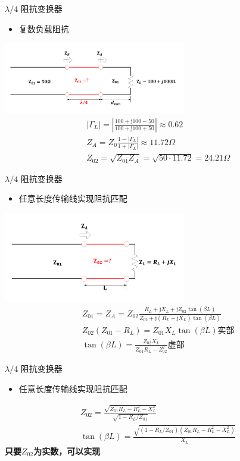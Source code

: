 \begin{frame}{$\lambda/4$ 阻抗变换器}
  \begin{itemize}
    \item 复数负载阻抗
  \end{itemize}
  \centering
  \includegraphics[width=8cm]{fig4-30.pdf}
  \begin{align*}
     & \lvert \Gamma_L \rvert = \left\lvert \frac{100+\mathrm{j}100-50}{100+\mathrm{j}100+50}\right\rvert \approx 0.62 \\
     & Z_A=Z_0 \frac{1-\lvert \Gamma_L\rvert}{1+\lvert \Gamma_L\rvert}\approx 11.72\Omega \\
     & Z_{02}=\sqrt{Z_{01}Z_A}=\sqrt{50\cdot 11.72}=24.21\Omega
  \end{align*}
\end{frame}

\begin{frame}{$\lambda/4$ 阻抗变换器}
  \begin{itemize}
    \item 任意长度传输线实现阻抗匹配
  \end{itemize}
  \centering
  \includegraphics[width=8cm]{fig4-31.pdf}
  \begin{align*}
     & Z_{01}=Z_A=Z_{02}\frac{R_L+\mathrm{j}X_L+\mathrm{j}Z_{02}\tan(\beta L)}{Z_{02}+\mathrm{j}(R_L+\mathrm{j}X_L)\tan(\beta L)} \\
     & Z_{02}(Z_{01}-R_L)=Z_{01}X_L\tan(\beta L) \text{实部}\\
     & \tan(\beta L)=\frac{Z_{02}X_L}{Z_{01}R_L-Z_{02}^2} \text{虚部}
  \end{align*}
\end{frame}

\begin{frame}{$\lambda/4$ 阻抗变换器}
  \begin{itemize}
    \item 任意长度传输线实现阻抗匹配
  \end{itemize}
   \begin{align*}
     & Z_{02}=\frac{\sqrt{Z_{01}R_L-R_L^2-X_L^2}}{\sqrt{1-R_L/Z_{01}}}\\
     & \tan(\beta L)=\frac{\sqrt{(1-R_L/Z_{01})(Z_{01}R_L-R_L^2-X_L^2)}}{X_L} 
  \end{align*}
  \textbf{只要$Z_{02}$为实数，可以实现}
\end{frame}

